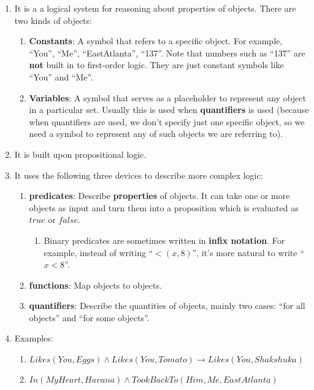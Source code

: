 \documentclass[12pt, letterpaper, oneside]{book}
\begin{document}
\begin{enumerate}
  \item It is a a logical system for reasoning about properties of objects.
        There are two kinds of objects:
        \begin{enumerate}
          \item \textbf{Constants}: A symbol that refers to a specific object. For
                example, ``You'', ``Me'', ``EastAtlanta'', ``137''. Note that
                numbers such as ``137'' are \textbf{not} built in to first-order logic.
                They are just constant symbols like ``You'' and ``Me''.
          \item \textbf{Variables}: A symbol that serves as a placeholder to
                represent any object in a particular set. Usually this is used when
                \textbf{quantifiers} is used (because when quantifiers are used, we
                don't specify just one specific object, so we need a symbol to
                represent any of such objects we are referring to).
        \end{enumerate}
  \item It is built upon propositional logic.
  \item It uses the following three devices to describe more complex logic:
        \begin{enumerate}
          \item \textbf{predicates}: Describe \textbf{properties} of objects. It
                can take one or more objects as input and turn them into a proposition
                which is evaluated as $true$ or $false$.
                \begin{enumerate}
                  \item Binary predicates are sometimes written in \textbf{infix
                          notation}. For example, instead of writing ``$<(x, 8)$'', it's
                        more natural to write ``$x < 8$''.
                \end{enumerate}
          \item \textbf{functions}: Map objects to objects.
          \item \textbf{quantifiers}: Describe the quantities of objects, mainly
                two cases: ``for all objects'' and ``for some objects''.
        \end{enumerate}
  \item Examples:
        \begin{enumerate}
          \item $Likes(You, Eggs) \land Likes(You, Tomato) \rightarrow
                  Likes(You, Shakshuka)$
          \item $In(MyHeart, Havana) \land TookBackTo(Him, Me, EastAtlanta)$
        \end{enumerate}
\end{enumerate}
\end{document}
